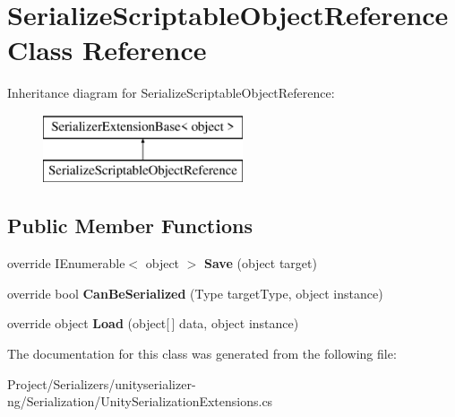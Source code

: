\hypertarget{class_serialize_scriptable_object_reference}{}\section{Serialize\+Scriptable\+Object\+Reference Class Reference}
\label{class_serialize_scriptable_object_reference}
Inheritance diagram for Serialize\+Scriptable\+Object\+Reference\+:\begin{figure}[H]
\begin{center}
\leavevmode
\includegraphics[height=2.000000cm]{class_serialize_scriptable_object_reference}
\end{center}
\end{figure}
\subsection*{Public Member Functions}
\begin{DoxyCompactItemize}
\item 
\mbox{\label{class_serialize_scriptable_object_reference_a5356a3b70d63530dfa62962144c23ff5}} 
override I\+Enumerable$<$ object $>$ {\bfseries Save} (object target)
\item 
\mbox{\label{class_serialize_scriptable_object_reference_a830bb74938329482397d7975b8853eaf}} 
override bool {\bfseries Can\+Be\+Serialized} (Type target\+Type, object instance)
\item 
\mbox{\label{class_serialize_scriptable_object_reference_a83057b58f36e559106c518db722a8b81}} 
override object {\bfseries Load} (object\mbox{[}$\,$\mbox{]} data, object instance)
\end{DoxyCompactItemize}


The documentation for this class was generated from the following file\+:\begin{DoxyCompactItemize}
\item 
Project/\+Serializers/unityserializer-\/ng/\+Serialization/Unity\+Serialization\+Extensions.\+cs\end{DoxyCompactItemize}

